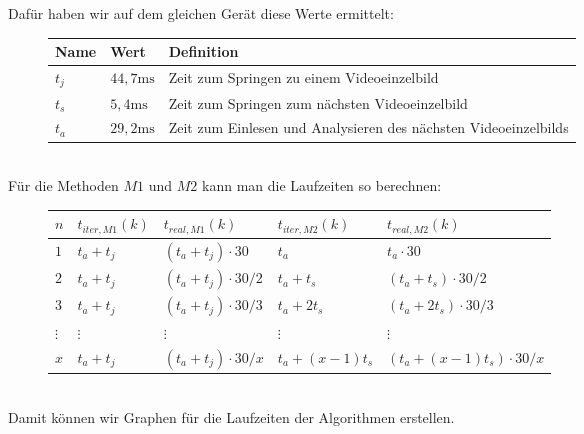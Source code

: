 \documentclass[11pt,a4paper]{article}
\newcommand{\ms}{\mathrm{ms}}
\begin{document}
Dafür haben wir auf dem gleichen Gerät diese Werte ermittelt:
\begin{figure}[htb!]
    \centering
    \begin{tabular}{p{.07\linewidth}|p{.07\linewidth}|p{.5\linewidth}}
        Name & Wert & Definition \\ \hline
        $t_j$ & $44,7 \ms$ & Zeit zum Springen zu einem Videoeinzelbild \\ \hline
        $t_s$ & $5,4 \ms$ & Zeit zum Springen zum nächsten Videoeinzelbild \\ \hline
        $t_a$ & $29,2 \ms$ & Zeit zum Einlesen und Analysieren des nächsten Videoeinzelbilds
    \end{tabular}
\end{figure}\\
Für die Methoden $M1$ und $M2$ kann man die Laufzeiten so berechnen:
\begin{figure}[htb!]
    \centering
    \begin{tabular}{p{.07\linewidth}|p{.2\linewidth}|p{.2\linewidth}|p{.2\linewidth}|p{.2\linewidth}}
        $n$ & $t_{iter, M1}(k)$ & $t_{real, M1}(k)$ & $t_{iter, M2}(k)$ & $t_{real, M2}(k)$\\ \hline
        $1$ & $t_a + t_j$ & $(t_a + t_j) \cdot 30$ & $t_a$ & $t_a \cdot 30$\\
        $2$ & $t_a + t_j$ & $(t_a + t_j) \cdot 30 / 2$ & $t_a + t_s$ & $(t_a+t_s) \cdot 30 / 2$\\
        $3$ & $t_a + t_j$ & $(t_a + t_j) \cdot 30 / 3$ & $t_a + 2t_s$ & $(t_a+2t_s) \cdot 30 / 3$\\
        $\vdots$ & $\vdots$ & $\vdots$ & $\vdots$ & $\vdots$\\
        $x$ & $t_a + t_j$ & $(t_a + t_j) \cdot 30 / x$ & $t_a + (x-1)t_s$ & $(t_a+(x-1)t_s) \cdot 30 / x$
    \end{tabular}
\end{figure}\\
Damit können wir Graphen für die Laufzeiten der Algorithmen erstellen.
\end{document}
